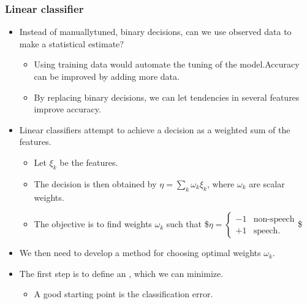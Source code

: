 \documentclass[letterpaper,10pt,english]{jupyterBook}
\begin{document}
\subsubsection{Linear classifier}
\label{\detokenize{Recognition/Voice_activity_detection:linear-classifier}}\begin{itemize}
\item {} 
\sphinxAtStartPar
Instead of manually\sphinxhyphen{}tuned, binary decisions, can we use observed
data to make a statistical estimate?
\begin{itemize}
\item {} 
\sphinxAtStartPar
Using training data would automate the tuning of the model.Accuracy can be improved by adding more data.

\item {} 
\sphinxAtStartPar
By replacing binary decisions, we can let tendencies in several
features improve accuracy.

\end{itemize}

\item {} 
\sphinxAtStartPar
Linear classifiers attempt to achieve a decision as a weighted sum
of the features.
\begin{itemize}
\item {} 
\sphinxAtStartPar
Let \(\xi_k\) be the features.

\item {} 
\sphinxAtStartPar
The decision is then obtained by \(\eta = \sum_k\omega_k\xi_k\),
where \(\omega_k\) are scalar weights.

\item {} 
\sphinxAtStartPar
The objective is to find weights \(\omega_k\) such that \$\(\eta = 
      \begin{cases}
        -1 & \text{non-speech} \\
        +1 & \text{speech}.
      \end{cases}\)\$

\end{itemize}

\item {} 
\sphinxAtStartPar
We then need to develop a method for choosing optimal
weights \(\omega_k\).

\item {} 
\sphinxAtStartPar
The first step is to define an , which we can
minimize.
\begin{itemize}
\item {} 
\sphinxAtStartPar
A good starting point is the classification error.


\end{itemize}
\end{itemize}
\end{document}
